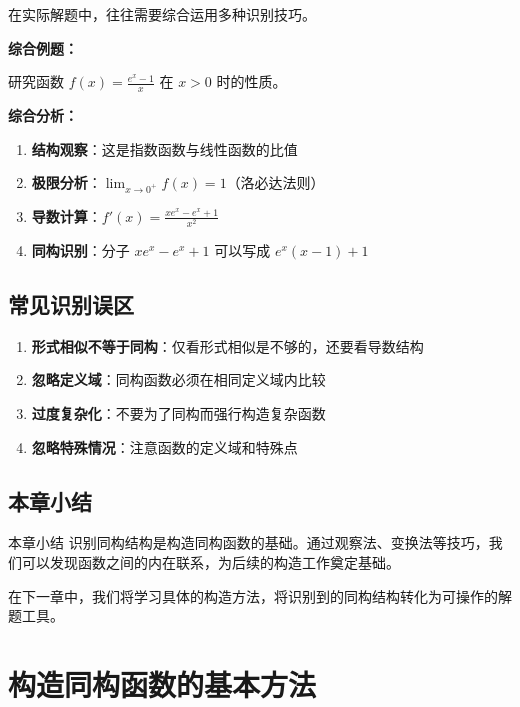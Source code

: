 \documentclass[a4paper,11pt]{ctexrep}
\newcommand{\exampleicon}{\ModeBadge[highlight]{例题}}
\newcommand{\analysisicon}{\ModeBadge[secondary]{分析}}
\theoremstyle{definition}
\begin{document}
在实际解题中，往往需要综合运用多种识别技巧。

\exampleicon \textbf{综合例题：}

研究函数 $f(x) = \frac{e^x - 1}{x}$ 在 $x > 0$ 时的性质。

\analysisicon \textbf{综合分析：}

\begin{enumerate}
    \item \textbf{结构观察}：这是指数函数与线性函数的比值
    \item \textbf{极限分析}：$\lim_{x \to 0^+} f(x) = 1$（洛必达法则）
    \item \textbf{导数计算}：$f'(x) = \frac{xe^x - e^x + 1}{x^2}$
    \item \textbf{同构识别}：分子 $xe^x - e^x + 1$ 可以写成 $e^x(x-1) + 1$
\end{enumerate}

\section{常见识别误区}

\begin{warningbox}[常见识别误区]
\begin{enumerate}
    \item \textbf{形式相似不等于同构}：仅看形式相似是不够的，还要看导数结构
    \item \textbf{忽略定义域}：同构函数必须在相同定义域内比较
    \item \textbf{过度复杂化}：不要为了同构而强行构造复杂函数
    \item \textbf{忽略特殊情况}：注意函数的定义域和特殊点
\end{enumerate}
\end{warningbox}

\section{本章小结}

\begin{summarybox}{本章小结}
识别同构结构是构造同构函数的基础。通过观察法、变换法等技巧，我们可以发现函数之间的内在联系，为后续的构造工作奠定基础。

在下一章中，我们将学习具体的构造方法，将识别到的同构结构转化为可操作的解题工具。
\end{summarybox}

\chapter{构造同构函数的基本方法}
\end{document}

